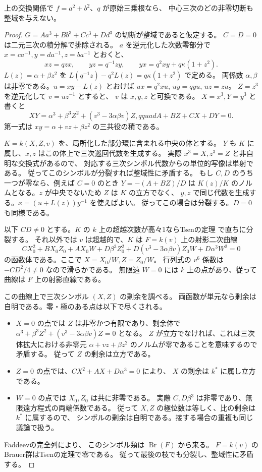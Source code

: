 \begin{lemma}\label{lem:cubic-CY-two-square-weyl-split}
上の交換関係で $f=a^2+b^2$、$q$ が原始三乗根なら、
中心三次のどの非零切断も整域を与えない。
\end{lemma}
\begin{proof}
$G=Aa^3+Bb^3+Cc^3+Dd^3$ の切断が整域であると仮定する。
$C=D=0$ は二元三次の積分解で排除される。
$a$ を逆元化した次数零部分で $x=ca^{-1},y=da^{-1},z=ba^{-1}$ とおくと、
\[
 xz=qzx,\qquad yz=q^{-1}zy,\qquad yx=q^2xy+q\kappa(1+z^2).
\]
$L(z)=\alpha+\beta z^2$ を
$L(q^{-1}z)-q^2L(z)=q\kappa(1+z^2)$ で定める。
両係数 $\alpha,\beta$ は非零である。$u=xy-L(z)$ とおけば
$ux=q^2xu$, $uy=qyu$, $uz=zu$。
$Z=z^3$ を逆元化して $v=uz^{-1}$ とすると、
$v$ は $x,y,z$ と可換である。
$X=x^3,Y=y^3$ と書くと
\[
 XY=\alpha^3+\beta^3 Z^2+(v^3-3\alpha\beta v)Z,qquad
 A+BZ+CX+DY=0 .
\]
第一式は $xy=\alpha+vz+\beta z^2$ の三共役の積である。

$K=k(X,Z,v)$ を、局所化した部分環に含まれる中央の体とする。
$Y$ も $K$ に属し、$x,z$ はこの体上で三次巡回代数を生成する。
実際 $x^3=X,z^3=Z$ と非自明な交換式があるので、
対応する三次シンボル代数からの単位的写像は単射である。
従ってこのシンボルが分裂すれば整域性に矛盾する。
もし $C,D$ のうち一つが零なら、例えば $C=0$ のとき
$Y=-(A+BZ)/D$ は $K(z)/K$ のノルムとなる。$z$ が中央でないため $Z$ は $K$ の立方でなく、
$y,z$ で同じ代数を生成する。$x=(u+L(z))y^{-1}$ を使えばよい。
従ってこの場合は分裂する。$D=0$ も同様である。

以下 $CD\ne0$ とする。$K$ の $k$ 上の超越次数が高々1ならTsenの定理
\cite[Tag 03RF]{StacksTsenBrauer}で直ちに分裂する。
それ以外では $v$ は超越的で、$K$ は $F=k(v)$ 上の射影二次曲線
\[
 C X_0^2+B X_0 Z_0+A X_0 W+
 D\beta^3 Z_0^2+D(v^3-3\alpha\beta v)Z_0W+D\alpha^3 W^2=0
\]
の函数体である。ここで $X=X_0/W,Z=Z_0/W$。
行列式の $v^6$ 係数は $-CD^2/4\ne0$ なので滑らかである。
無限遠 $W=0$ には $k$ 上の点があり、従って曲線は $F$ 上の射影直線である。

この曲線上で三次シンボル $(X,Z)$ の剰余を調べる。
両函数が単元なら剰余は自明である。零・極のある点は以下で尽くされる。
\begin{itemize}
\item $X=0$ の点では $Z$ は非零かつ有限であり、剰余体で
$\alpha^3+\beta^3 Z^2+(v^3-3\alpha\beta v)Z=0$ となる。
$Z$ が立方でなければ、これは三次体拡大における非零元
$\alpha+v z+\beta z^2$ のノルムが零であることを意味するので矛盾する。
従って $Z$ の剰余は立方である。
\item $Z=0$ の点では、$CX^2+AX+D\alpha^3=0$ により、
$X$ の剰余は $k^*$ に属し立方である。
\item $W=0$ の点では $X_0,Z_0$ は共に非零である。
実際 $C,D\beta^3$ は非零であり、無限遠方程式の両端係数である。
従って $X,Z$ の極位数は等しく、比の剰余は $k^*$ に属するので、
シンボルの剰余は自明である。接する場合の重複も同じ議論で扱う。
\end{itemize}
Faddeevの完全列\cite[Theorem 6.4.5]{GilleSzamuelyFaddeev}により、
このシンボル類は $\operatorname{Br}(F)$ から来る。
$F=k(v)$ のBrauer群はTsenの定理で零である。
従って最後の枝でも分裂し、整域性に矛盾する。
\end{proof}

